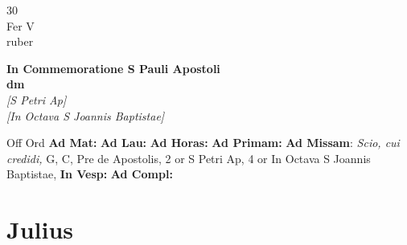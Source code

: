 \documentclass[10pt, openany]{book}
\begin{document}
    \begin{center}
        \begin{minipage}{3.5in}
            \vspace{2em}
            \begin{minipage}{0.5in}
                {\Huge 30} \\
                {\normalsize Fer V} \\
                {\normalsize ruber}
            \end{minipage}
            \begin{minipage}{3.0in}
                \textbf{ \large In Commemoratione S Pauli Apostoli \\
                \textnormal{\normalsize dm}} \\ \textit{[S Petri Ap]} \\ \textit{[In Octava S Joannis Baptistae]} \\ 
            \end{minipage}
            \begin{justify}Off Ord
                \textbf{Ad Mat: }
                \textbf{Ad Lau: }
                \textbf{Ad Horas: }
                \textbf{Ad Primam: }\textbf{Ad Missam}: \textit{Scio, cui credidi,} G, C, Pre de Apostolis, 2 or S Petri Ap, 4 or In Octava S Joannis Baptistae,  
                \textbf{In Vesp: }
                \textbf{Ad Compl: }
            \end{justify}
        \end{minipage}
    \end{center}

    \chapter{Julius}
                    
\end{document}
